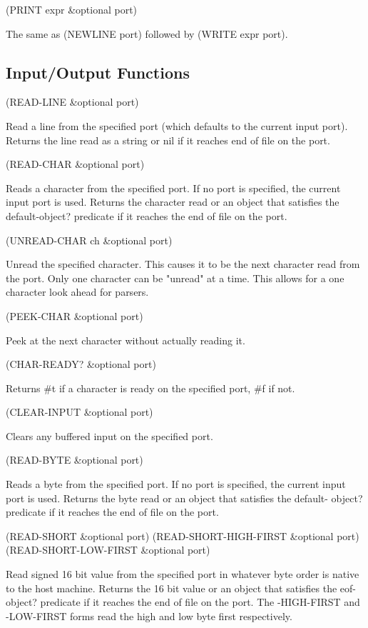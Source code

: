 \documentclass[11pt]{article}
\begin{document}
(PRINT expr \&optional port)

The same as (NEWLINE port) followed by (WRITE expr port).
\subsection{Input/Output Functions}
\label{sec-1-36}

(READ-LINE \&optional port)

Read a line from the specified port (which defaults to the current input
port).  Returns the line read as a string or nil if it reaches end of
file on the port.

(READ-CHAR \&optional port)

Reads a character from the specified port. If no port is specified, the
current input port is used. Returns the character read or an object that
satisfies the default-object? predicate if it reaches the end of file on
the port.

(UNREAD-CHAR ch \&optional port)

Unread the specified character.  This causes it to be the next character
read from the port.  Only one character can be "unread" at a time.  This
allows for a one character look ahead for parsers.

(PEEK-CHAR \&optional port)

Peek at the next character without actually reading it.

(CHAR-READY? \&optional port)

Returns \#t if a character is ready on the specified port, \#f if not.

(CLEAR-INPUT \&optional port)

Clears any buffered input on the specified port.

(READ-BYTE \&optional port)

Reads a byte from the specified port. If no port is specified, the
current input port is used. Returns the byte read or an object that
satisfies the default- object? predicate if it reaches the end of file
on the port.

(READ-SHORT \&optional port)
(READ-SHORT-HIGH-FIRST \&optional port)
(READ-SHORT-LOW-FIRST \&optional port)

Read signed 16 bit value from the specified port in whatever byte order
is native to the host machine.  Returns the 16 bit value or an object
that satisfies the eof-object? predicate if it reaches the end of file
on the port.  The -HIGH-FIRST and -LOW-FIRST forms read the high and low
byte first respectively.
\end{document}
